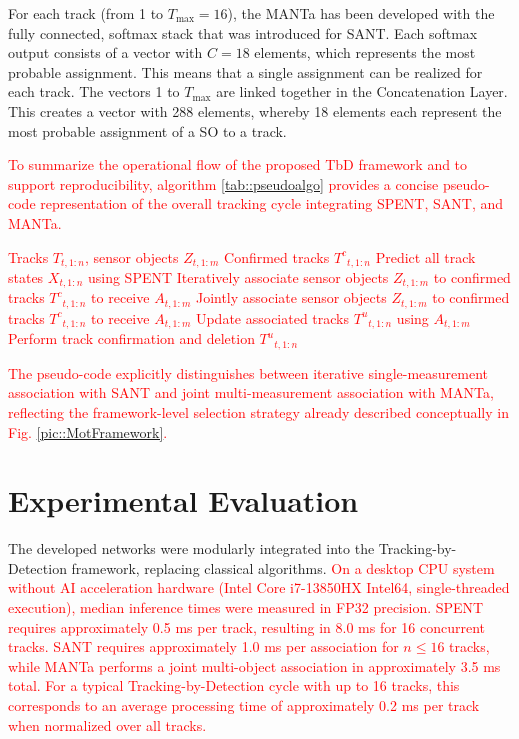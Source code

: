 \documentclass[letterpaper, 10 pt, journal, twoside]{IEEEtran}
\newcommand{\red}[1]{\textcolor{red}{#1}}
\begin{document}
For each track (from 1 to $T_{\max}=16$), the MANTa has been developed with the fully connected, softmax stack that was introduced for \ac{SANT}.
Each softmax output consists of a vector with $C=18$ elements, which represents the most probable assignment.
This means that a single assignment can be realized for each track.
The vectors 1 to $T_{\max}$ are linked together in the Concatenation Layer.
This creates a vector with 288 elements, whereby 18 elements each represent the most probable assignment of a \ac{SO} to a track.

\red{To summarize the operational flow of the proposed \ac{TbD} framework and to support reproducibility, algorithm {\ref{tab::pseudoalgo}} provides a concise pseudo-code representation of the overall tracking cycle integrating \ac{SPENT}, \ac{SANT}, and \ac{MANTa}.}

\begin{algorithm}[h]
    \caption{\red{Tracking-by-Detection Cycle with SPENT, SANT, and MANTa}}
    \label{tab::pseudoalgo}
    \begin{algorithmic}[1]
        \REQUIRE \red{Tracks ${T}_{t,1:n}$, sensor objects ${Z}_{t,1:m}$}
        \ENSURE \red{Confirmed tracks ${T^c}_{t,1:n}$}
        \STATE \red{Predict all track states ${X}_{t,1:n}$ using SPENT}
            \IF{\red{SANT is used}}
                \STATE \red{Iteratively associate sensor objects ${Z}_{t,1:m}$ to confirmed tracks ${T^c}_{t,1:n}$ to receive ${A}_{t,1:m}$}
            \ELSIF{\red{MANTa is used}}
                \STATE \red{Jointly associate sensor objects ${Z}_{t,1:m}$ to confirmed tracks ${T^c}_{t,1:n}$ to receive ${A}_{t,1:m}$}
            \ENDIF
        \STATE \red{Update associated tracks ${T^u}_{t,1:n}$ using ${A}_{t,1:m}$}
        \STATE \red{Perform track confirmation and deletion}
        \RETURN \red{${T^u}_{t,1:n}$}
    \end{algorithmic}
\end{algorithm}

\red{The pseudo-code explicitly distinguishes between iterative single-measurement association with \ac{SANT} and joint multi-measurement association with \ac{MANTa}, reflecting the framework-level selection strategy already described conceptually in Fig. {\ref{pic::MotFramework}}.}

\section{Experimental Evaluation}
The developed networks were modularly integrated into the Tracking-by-Detection framework, replacing classical algorithms.
\red{On a desktop CPU system without AI acceleration hardware (Intel Core i7-13850HX Intel64, single-threaded execution),
median inference times were measured in FP32 precision.
SPENT requires approximately 0.5 ms per track, resulting in 8.0 ms for 16 concurrent tracks.
SANT requires approximately 1.0 ms per association for $n\leq16$ tracks, while MANTa performs a joint multi-object association in approximately 3.5 ms total. For a typical Tracking-by-Detection cycle with up to 16 tracks, this corresponds to an average processing time of approximately 0.2 ms per track when normalized over all tracks.}
\end{document}
